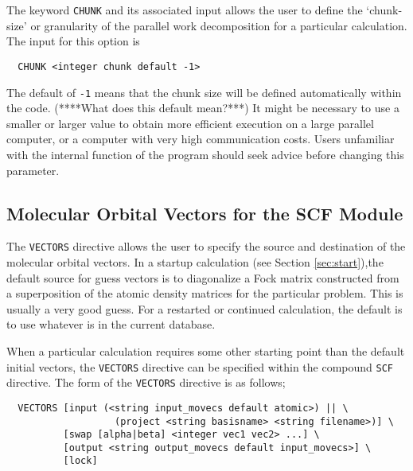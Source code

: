 
The keyword \verb+CHUNK+ and its associated input allows the user to
define the  `chunk-size' or granularity of the
parallel work decomposition for a particular calculation.  The input for this
option is
\begin{verbatim}
  CHUNK <integer chunk default -1>
\end{verbatim}

The default of \verb+-1+ means that the chunk size will be defined
automatically within the code.  
\Large 
(****What does this default mean?***)
\normalsize  
It might be necessary to use a smaller
or larger value to obtain more efficient execution on a large
parallel computer, or a computer with very high communication costs.
Users unfamiliar with the internal function of the program should seek
advice before changing this parameter.

\subsection{Molecular Orbital Vectors for the SCF Module}
\label{sec:vectors}

The \verb+VECTORS+ directive allows the user to specify the source and 
destination of the molecular orbital vectors.  In a startup calculation 
(see Section \ref{sec:start}),the default
source for guess vectors is to diagonalize a Fock matrix constructed
from a superposition of the atomic density matrices for the particular
problem.  This is usually
a very good guess.   For a restarted or continued calculation, the default
is to use whatever is in the current database.

When a particular calculation requires some other starting point than 
the default initial vectors, the \verb+VECTORS+ directive can be specified
within the compound 
\verb+SCF+ directive.  The form of the \verb+VECTORS+ directive is
as follows;  


\begin{verbatim}
  VECTORS [input (<string input_movecs default atomic>) || \
                   (project <string basisname> <string filename>)] \
          [swap [alpha|beta] <integer vec1 vec2> ...] \
          [output <string output_movecs default input_movecs>] \
          [lock]
\end{verbatim}

